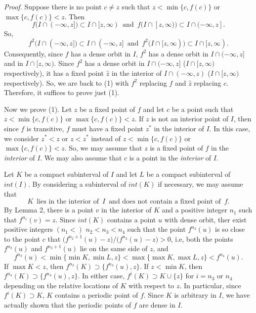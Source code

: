 \documentclass[12pt]{article}
\begin{document}
\noindent
{\it Proof.}
Suppose there is no point $c \ne z$ such that $z < \min \big\{ c, f(c) \big\}$ or $\max \big\{ c, f(c) \big\} < z$.  Then $$f\big(I \cap (-\infty, z]\big) \subset I \cap [z, \infty) \,\,\, \text{and} \,\,\, f\big(I \cap [z, \infty)\big) \subset I \cap (-\infty, z].$$ So, $$f^2\big(I \cap (-\infty, z]\big) \subset I \cap (-\infty, z] \,\,\, \text{and} \,\,\, f^2\big(I \cap [z, \infty)\big) \subset I \cap [z, \infty).$$  Consequently, since $f$ has a dense orbit in $I$, $f^2$ has a dense orbit in $I \cap (-\infty, z]$ and in $I \cap [z, \infty)$.  Since $f^2$ has a dense orbit in $I \cap (-\infty, z]$ \big($I \cap [z, \infty)$ respectively\big), it has a fixed point $\hat z$ in the interior of $I \cap (-\infty, z)$ \big($I \cap [z, \infty)$ respectively\big).  So, we are back to (1) with $f^2$ replacing $f$ and $\hat z$ replacing $c$.  Therefore, it suffices to prove just (1).  

Now we prove (1).  Let $z$ be a fixed point of $f$ and let $c$ be a point such that $z < \min \big\{ c, f(c) \big\}$ or $\max \{ c, f(c) \} < z$.  If $z$ is not an interior point of $I$, then since $f$ is transitive, $f$ must have a fixed point $z^*$ in the interior of $I$.  In this case, we consider $z^* < z$ or $z < z^*$ instead of $z < \min\{ c, f(c) \}$ or $\max\big\{ c, f(c) \big\} < z$.  So, we may assume that $z$ is a fixed point of $f$ in the {\it interior} of $I$.  We may also assume that $c$ is a point in the {\it interior} of $I$.  

Let $K$ be a compact subinterval of $I$ and let $L$ be a compact subinterval of $int(I)$.  By considering a subinterval of $int(K)$ if necessary, we may assume that$$K \,\,\, \text{lies in the interior of} \,\,\, I \,\,\, \text{and does not contain a fixed point of} \,\,\, f.$$By Lemma 2, there is a point $v$ in the interior of $K$ and a positive integer $n_1$ such that $f^{n_1}(v) = z$.  Since $int(K)$ contains a point $u$ with dense orbit, ther exist positive integers $(n_1 <)$ $n_2 < n_3 < n_4$ such that the point $f^{n_2}(u)$ is so close to the point $c$ that $\big(f^{n_2+1}(u) - z\big)/\big(f^{n_2}(u) - z\big) > 0$, i.e, both the points $f^{n_2}(u)$ and $f^{n_2+1}(u)$ lie on the same side of $z$, and$$f^{n_3}(u) < \min \big\{\min K, \min L, z \big\} < \max \big\{\max K, \max L, z \big\} < f^{n_4}(u).$$If $\max K < z$, then $f^{n_3}(K) \supset \big\{ f^{n_3}(u), z \big\}$.  If $z < \min K$, then $f^{n_4}(K) \supset \big\{ f^{n_4}(u), z \big\}$.  In either case, $f^i(K) \supset K \cup \big\{ z \big\}$ for $i = n_3$ or $n_4$ depending on the relative locations of $K$ with respect to $z$.  In particular, since $f^i(K) \supset K$, $K$ contains a periodic point of $f$.  Since $K$ is arbitrary in $I$, we have actually shown that the periodic points of $f$ are dense in $I$.  
\end{document}
